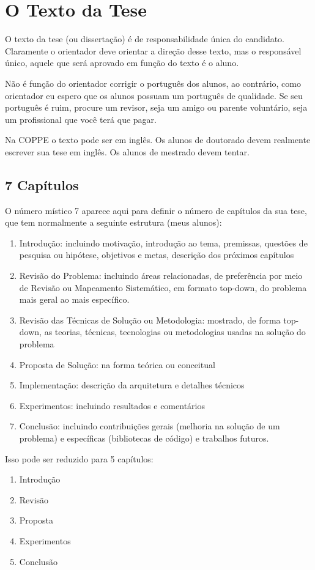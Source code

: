 \chapter{O Texto da Tese}

O texto da tese (ou dissertação) é de responsabilidade única do candidato. Claramente o orientador deve orientar a direção desse texto, mas o responsável único, aquele que será aprovado em função do texto é o aluno.

Não é função do orientador corrigir o português dos alunos, ao contrário, como orientador eu espero que os alunos possuam um português de qualidade. Se seu português é ruim, procure um revisor, seja um amigo ou parente voluntário, seja um profissional que você terá que pagar.

Na COPPE o texto pode ser em inglês. Os alunos de doutorado devem realmente escrever sua tese em inglês. Os alunos de mestrado devem tentar.

\section{7 Capítulos }
O número místico 7 aparece aqui para definir o número de capítulos da sua tese, que tem normalmente a seguinte estrutura (meus alunos):
\begin{enumerate}
\item	Introdução: incluindo motivação, introdução ao tema, premissas, questões de pesquisa ou hipótese, objetivos e metas, descrição dos próximos capítulos
\item	Revisão do Problema: incluindo áreas relacionadas, de preferência por meio de Revisão ou Mapeamento Sistemático, em formato top-down, do problema mais geral ao mais específico.
\item	Revisão das Técnicas de Solução ou Metodologia: mostrado, de forma top-down, as teorias, técnicas, tecnologias ou metodologias usadas na solução do problema
\item	Proposta de Solução: na forma teórica ou conceitual
\item	Implementação: descrição da arquitetura e detalhes técnicos
\item	Experimentos: incluindo resultados e comentários
\item	Conclusão: incluindo contribuições gerais (melhoria na solução de um problema) e específicas (bibliotecas de código) e trabalhos futuros.
\end{enumerate}


Isso pode ser reduzido para 5 capítulos:
\begin{enumerate}
    \item	Introdução
   \item	Revisão
   \item	Proposta
   \item	Experimentos
   \item	Conclusão
\end{enumerate}

